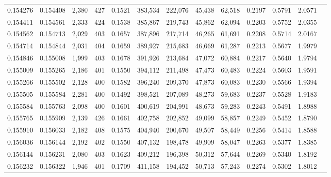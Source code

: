 \begin{tabular}{rrrrrrrrrrrrr}
0.154276 & 0.154408 & 2,380 & 427 &                                     0.1521 & 383,534 & 222,076 &  45,438 &  62,518 & 0.2197 & 0.5791 & 2.0571 \\
0.154411 & 0.154561 & 2,333 & 424 &                                     0.1538 & 385,867 & 219,743 &  45,862 &  62,094 & 0.2203 & 0.5752 & 2.0355 \\
0.154562 & 0.154713 & 2,029 & 403 &                                     0.1657 & 387,896 & 217,714 &  46,265 &  61,691 & 0.2208 & 0.5714 & 2.0167 \\
0.154714 & 0.154844 & 2,031 & 404 &                                     0.1659 & 389,927 & 215,683 &  46,669 &  61,287 & 0.2213 & 0.5677 & 1.9979 \\
0.154846 & 0.155008 & 1,999 & 403 &                                     0.1678 & 391,926 & 213,684 &  47,072 &  60,884 & 0.2217 & 0.5640 & 1.9794 \\
0.155009 & 0.155265 & 2,186 & 401 &                                     0.1550 & 394,112 & 211,498 &  47,473 &  60,483 & 0.2224 & 0.5603 & 1.9591 \\
0.155266 & 0.155502 & 2,128 & 400 &                                     0.1582 & 396,240 & 209,370 &  47,873 &  60,083 & 0.2230 & 0.5566 & 1.9394 \\
0.155505 & 0.155584 & 2,281 & 400 &                                     0.1492 & 398,521 & 207,089 &  48,273 &  59,683 & 0.2237 & 0.5528 & 1.9183 \\
0.155584 & 0.155763 & 2,098 & 400 &                                     0.1601 & 400,619 & 204,991 &  48,673 &  59,283 & 0.2243 & 0.5491 & 1.8988 \\
0.155765 & 0.155909 & 2,139 & 426 &                                     0.1661 & 402,758 & 202,852 &  49,099 &  58,857 & 0.2249 & 0.5452 & 1.8790 \\
0.155910 & 0.156033 & 2,182 & 408 &                                     0.1575 & 404,940 & 200,670 &  49,507 &  58,449 & 0.2256 & 0.5414 & 1.8588 \\
0.156036 & 0.156144 & 2,192 & 402 &                                     0.1550 & 407,132 & 198,478 &  49,909 &  58,047 & 0.2263 & 0.5377 & 1.8385 \\
0.156144 & 0.156231 & 2,080 & 403 &                                     0.1623 & 409,212 & 196,398 &  50,312 &  57,644 & 0.2269 & 0.5340 & 1.8192 \\
0.156232 & 0.156322 & 1,946 & 401 &                                     0.1709 & 411,158 & 194,452 &  50,713 &  57,243 & 0.2274 & 0.5302 & 1.8012 \\

\end{tabular}
